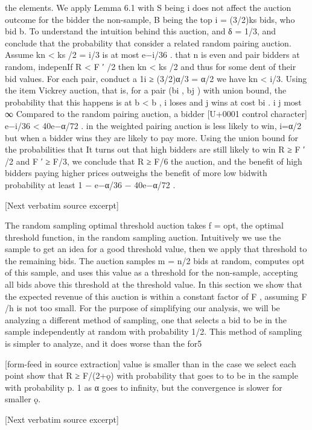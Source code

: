 \documentclass[10pt]{article}
\begin{document}
\begin{ReviewVerbatim}
the elements. We apply Lemma 6.1 with S being i does not affect the auction outcome for the bidder
the non-sample, B being the top i = (3/2)ks bids, who bid b.
To understand the intuition behind this auction,
and δ = 1/3, and conclude that the probability that
consider
a related random pairing auction. Assume
kn < ks /2 = i/3 is at most e−i/36 .
that
n
is
even and pair bidders at random, indepenIf R < F ′ /2 then kn < ks /2 and thus for some
dent
of
their
bid values. For each pair, conduct a 1i ≥ (3/2)α/3 = α/2 we have kn < i/3. Using the
item
Vickrey
auction, that is, for a pair (bi , bj ) with
union bound, the probability that this happens is at
b
<
b
,
i
loses
and j wins at cost bi .
i
j
most
∞
Compared
to
the random pairing auction, a bidder
[U+0001 control character]
e−i/36 < 40e−α/72 .
in the weighted pairing auction is less likely to win,
i=α/2
but when a bidder wins they are likely to pay more.
Using the union bound for the probabilities that It turns out that high bidders are still likely to win
R ≥ F ′ /2 and F ′ ≥ F/3, we conclude that R ≥ F/6 the auction, and the benefit of high bidders paying
higher prices outweighs the benefit of more low bidwith probability at least 1 − e−α/36 − 40e−α/72 .

[Next verbatim source excerpt]

The random sampling optimal threshold auction
takes f = opt, the optimal threshold function, in
the random sampling auction. Intuitively we use the
sample to get an idea for a good threshold value,
then we apply that threshold to the remaining bids.
The auction samples m = n/2 bids at random, computes opt of this sample, and uses this value as a
threshold for the non-sample, accepting all bids above
this threshold at the threshold value. In this section
we show that the expected revenue of this auction is
within a constant factor of F , assuming F /h is not
too small.
For the purpose of simplifying our analysis, we will
be analyzing a different method of sampling, one that
selects a bid to be in the sample independently at random with probability 1/2. This method of sampling
is simpler to analyze, and it does worse than the for5


[form-feed in source extraction]
value is smaller than in the case we select each point show that R ≥ F/(2+ǫ) with probability that goes to
to be in the sample with probability p.
1 as α goes to infinity, but the convergence is slower
for smaller ǫ.

[Next verbatim source excerpt]


\end{ReviewVerbatim}
\end{document}
